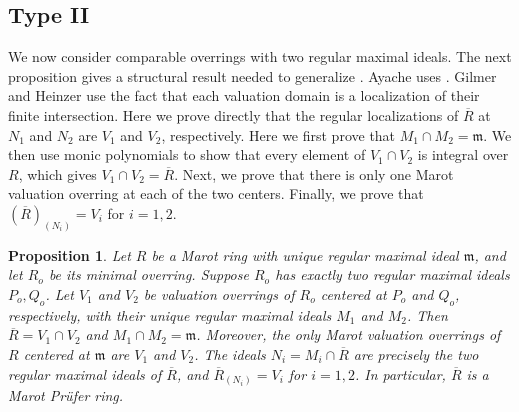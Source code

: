 \documentclass[12pt]{article}
\newtheorem{proposition}{Proposition}
\begin{document}
\subsection{Type II}\label{subsec-type-ii}
	We now consider comparable overrings with two regular maximal ideals. The next proposition gives a structural result needed to generalize \cite[Proposition 23]{ayache}. Ayache uses \cite[Proposition 2.5]{gilmer-heinzer}. Gilmer and Heinzer use the fact that each valuation domain
	is a localization of their finite intersection. Here we prove directly that the regular localizations of
	$\overline R$ at $N_1$ and $N_2$ are $V_1$ and $V_2$, respectively. Here we first prove that $M_1\cap M_2=\mathfrak m$. We then use monic polynomials to show that every element of $V_1\cap V_2$ is integral over $R$, which gives $V_1\cap V_2=\overline R$. Next, we prove that there is only one Marot valuation overring at each of the two centers. Finally, we prove that $(\overline R)_{(N_i)}=V_i$ for $i=1,2$.
	\begin{proposition}\label{minimal-two}
		Let $R$ be a Marot ring with unique regular maximal ideal $\mathfrak{m}$, and let $R_o$ be its minimal overring. Suppose $R_o$ has exactly two regular maximal ideals $P_o,Q_o$. Let $V_1$ and $V_2$ be valuation overrings of $R_o$ centered at $P_o$ and $Q_o$, respectively, with their unique regular maximal ideals $M_1$ and $M_2$. Then $\overline R=V_1\cap V_2$ and $M_1\cap M_2=\mathfrak{m}$. Moreover, the only Marot valuation overrings of $R$ centered at $\mathfrak{m}$ are $V_1$ and $V_2$. The ideals $N_i=M_i\cap\overline R$ are precisely the two regular maximal ideals of $\overline R$, and $\overline R_{(N_i)}=V_i$ for $i=1,2$. In particular, $\overline R$ is a Marot Prüfer ring.
	\end{proposition}
\end{document}
